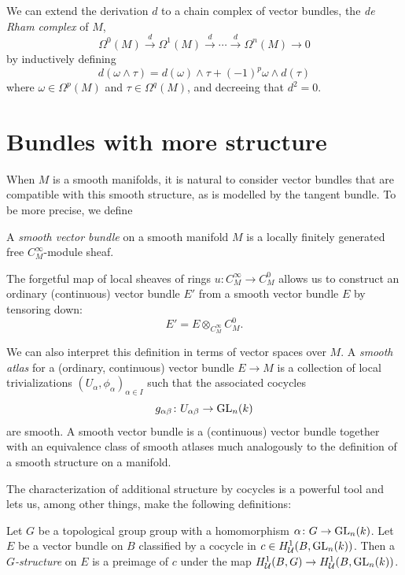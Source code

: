 \documentclass[a4paper,openany]{scrbook}
\begin{document}
We can extend the derivation $d$ to a chain complex of vector bundles, the \emph{de Rham complex} of $M$,
\[
\Omega^0(M) \xrightarrow{d} \Omega^1(M) \xrightarrow{d} \cdots \xrightarrow{d} \Omega^n(M) \to 0
\]
by inductively defining
\[
d(\omega \wedge \tau) = d(\omega) \wedge \tau + (-1)^{p} \omega \wedge d(\tau)
\]
where $\omega \in \Omega^p(M)$ and $\tau \in \Omega^q(M)$, and decreeing that $d^2=0$.

\section{Bundles with more structure}

When $M$ is a smooth manifolds, it is natural to consider vector bundles that are compatible with this smooth structure, as is modelled by the tangent bundle. To be more precise, we define

\begin{defn}
A \emph{smooth vector bundle} on a smooth manifold $M$ is a locally finitely generated free $C^\infty_M$-module sheaf.
\end{defn}

The forgetful map of local sheaves of rings $u\colon C^\infty_M \to C^0_M$ allows us to construct an ordinary (continuous) vector bundle $E'$ from a smooth vector bundle $E$ by tensoring down:
\[
E' = E \otimes_{C^\infty_M} C^0_M.
\]

We can also interpret this definition in terms of vector spaces over $M$. A \emph{smooth atlas} for a (ordinary, continuous) vector bundle $E \to M$ is a collection of local trivializations $(U_\alpha,\phi_\alpha)_{\alpha \in I}$ such that the associated cocycles
\[
g_{\alpha\beta}\colon U_{\alpha\beta} \to \operatorname{GL}_n(k)
\]
are smooth. A smooth vector bundle is a (continuous) vector bundle together with an equivalence class of smooth atlases much analogously to the definition of a smooth structure on a manifold.

The characterization of additional structure by cocycles is a powerful tool and lets us, among other things, make the following definitions:

\begin{defn}
Let $G$ be a topological group group with a homomorphism $\alpha\colon G \to \operatorname{GL}_n(k)$. Let $E$ be a vector bundle on $B$ classified by a cocycle in $c \in H^1_{\mathcal U}(B,\operatorname{GL}_n(k))$. Then a \emph{$G$-structure} on $E$ is a preimage of $c$ under the map $H^1_{\mathcal U}(B,G) \to H^1_{\mathcal U}(B,\operatorname{GL}_n(k))$.
\end{defn}
\end{document}
